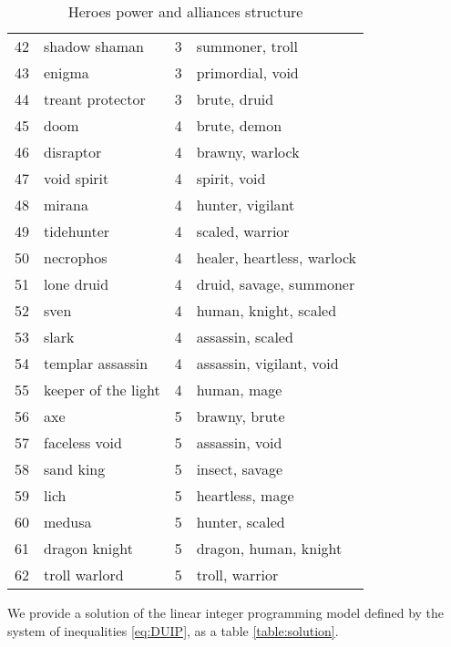 \documentclass[smallextended]{svjour3}       %
\begin{document}
\begin{table}
{\begin{tabular}{llrl}
42 &        shadow shaman &      3 &                summoner, troll \\
43 &               enigma &      3 &               primordial, void \\
44 &     treant protector &      3 &                   brute, druid \\
45 &                 doom &      4 &                   brute, demon \\
46 &            disraptor &      4 &               brawny, warlock  \\
47 &          void spirit &      4 &                   spirit, void \\
48 &               mirana &      4 &               hunter, vigilant \\
49 &           tidehunter &      4 &               scaled, warrior  \\
50 &            necrophos &      4 &    healer, heartless, warlock  \\
51 &           lone druid &      4 &        druid, savage, summoner \\
52 &                 sven &      4 &          human, knight, scaled \\
53 &                slark &      4 &               assassin, scaled \\
54 &     templar assassin &      4 &       assassin, vigilant, void \\
55 &  keeper of the light &      4 &                    human, mage \\
56 &                  axe &      5 &                  brawny, brute \\
57 &        faceless void &      5 &                 assassin, void \\
58 &            sand king &      5 &                 insect, savage \\
59 &                 lich &      5 &                heartless, mage \\
60 &               medusa &      5 &                 hunter, scaled \\
61 &        dragon knight &      5 &          dragon, human, knight \\
62 &        troll warlord &      5 &                troll, warrior  \\
\bottomrule
\end{tabular}
}
\caption{Heroes power and alliances  structure}
\label{table:aliances}
\end{table}

We provide a solution of the linear integer programming model defined by the system of inequalities \eqref{eq:DUIP}, as a table \ref{table:solution}.
\end{document}
